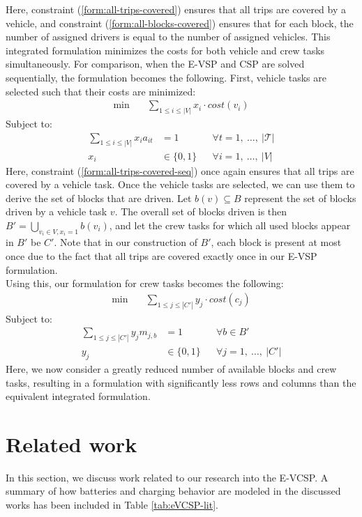 \documentclass[]{article}
\begin{document}
Here, constraint (\ref{form:all-trips-covered}) ensures that all trips are covered by a vehicle, and constraint (\ref{form:all-blocks-covered}) ensures that for each block, the number of assigned drivers is equal to the number of assigned vehicles. This integrated formulation minimizes the costs for both vehicle and crew tasks simultaneously. For comparison, when the E-VSP and CSP are solved sequentially, the formulation becomes the following. First, vehicle tasks are selected such that their costs are minimized:
\begin{align}
\min \quad
& \sum_{1 \leq i \leq |V|} x_{i} \cdot cost(v_i)
\end{align}
Subject to:
\begin{align}
\sum_{1 \leq i \leq |V|} x_{i}a_{it} &= 1 && \forall t = 1,\:\dots,\:|\mathcal{T}| \label{form:all-trips-covered-seq} \\
x_{i} &\in \{ 0, 1 \} && \forall i = 1,\:\dots,\:|V|
\end{align}
Here, constraint (\ref{form:all-trips-covered-seq}) once again ensures that all trips are covered by a vehicle task. Once the vehicle tasks are selected, we can use them to derive the set of blocks that are driven. Let $b(v) \subseteq B$ represent the set of blocks driven by a vehicle task $v$. The overall set of blocks driven is then $B' = \bigcup_{v_i \in V, x_i = 1}b(v_i)$, and let the crew tasks for which all used blocks appear in $B'$ be $C'$. Note that in our construction of $B'$, each block is present at most once due to the fact that all trips are covered exactly once in our E-VSP formulation. \\
Using this, our formulation for crew tasks becomes the following:
\begin{align}
\min \quad
& \sum_{1 \leq j \leq |C'|} y_{j} \cdot cost(c_j)  
\end{align}
Subject to:
\begin{align}
\sum_{1 \leq j \leq |C'|} y_j m_{j,b} &= 1  && \forall b \in B' \label{form:all-blocks-covered-seq} \\
y_{j} &\in \{ 0, 1 \} && \forall j = 1,\:\dots,\:|C'|
\end{align}
Here, we now consider a greatly reduced number of available blocks and crew tasks, resulting in a formulation with significantly less rows and columns than the equivalent integrated formulation.

\section{Related work}
In this section, we discuss work related to our research into the E-VCSP. A summary of how batteries and charging behavior are modeled in the discussed works has been included in Table \ref{tab:eVCSP-lit}.
\end{document}
